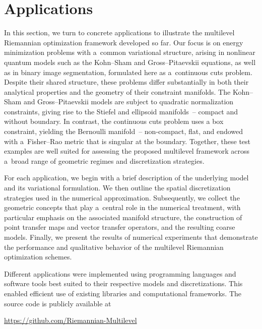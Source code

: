 \documentclass[11pt,reqno]{amsart}
\theoremstyle{plain}
\begin{document}
	
	\section{Applications}
	\label{sec:applications}
	
	In this section, we turn to concrete applications to illustrate the multilevel Riemannian optimization framework developed so far. Our focus is on energy minimization problems with a~common variational structure, arising in nonlinear quantum models such as the Kohn--Sham and Gross--Pitaevskii equations, as well as in binary image segmentation, formulated here as a~continuous cuts problem. Despite their shared structure, these problems differ substantially in both their analytical properties and the geometry of their constraint manifolds. The Kohn--Sham and Gross--Pitaevskii models are subject to quadratic normalization constraints, giving rise to the Stiefel and ellipsoid manifolds~-- compact and without boundary. In contrast, the continuous cuts problem uses a box constraint, yielding the Bernoulli manifold~-- non-compact, flat, and endowed with a~Fisher--Rao metric that is singular at the boundary. Together, these test examples are well suited for assessing the proposed multilevel framework across a~broad range of geometric regimes and discretization strategies. 
	
	For each application, we begin with a brief description of the underlying model and its variational formulation. We then outline the spatial discretization strategies used in the numerical approximation. Subsequently, we collect the geometric concepts that play a~central role in the numerical treatment, with particular emphasis on the associated manifold structure, the construction of point transfer maps and vector transfer operators, and the resulting coarse models. Finally, we present the results of numerical experiments that demonstrate the performance and qualitative behavior of the multilevel Riemannian optimization schemes. 
	
	Different applications were implemented using programming languages and software tools best suited to their respective models and discretizations. This enabled efficient use of existing libraries and computational frameworks. The source code is publicly available at
	\begin{center}
		\url{https://github.com/Riemannian-Multilevel}
	\end{center}
	
\end{document}

